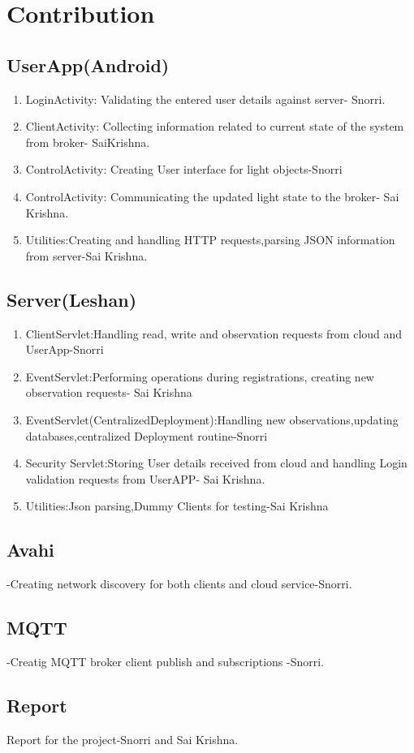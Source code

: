 \section{Contribution}
\subsection{UserApp(Android)}
\begin{enumerate}
\item LoginActivity: Validating the entered user details against server- Snorri.
\item ClientActivity: Collecting information related to current state of the system from broker- SaiKrishna.
\item ControlActivity: Creating User interface for light objects-Snorri
\item  ControlActivity: Communicating the updated light state to the broker- Sai Krishna.
\item Utilities:Creating and handling HTTP requests,parsing JSON information from server-Sai Krishna.
\end{enumerate}

\subsection{Server(Leshan)}
\begin{enumerate}
\item ClientServlet:Handling read, write and observation requests from cloud and UserApp-Snorri
\item EventServlet:Performing operations during registrations, creating new observation requests- Sai Krishna

\item EventServlet(CentralizedDeployment):Handling new observations,updating databases,centralized Deployment routine-Snorri

\item Security Servlet:Storing User details received from cloud and handling Login validation requests from UserAPP- Sai Krishna.

\item Utilities:Json parsing,Dummy Clients for testing-Sai Krishna
\end{enumerate}
\subsection{Avahi}-Creating network discovery for both clients and cloud service-Snorri.
\subsection{MQTT}-Creatig MQTT broker client publish and subscriptions -Snorri.

\subsection{Report} Report for the project-Snorri and Sai Krishna.